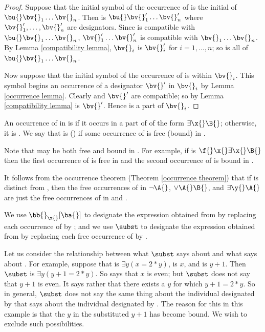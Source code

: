 \begin{proof}
    Suppose that the initial symbol of the occurrence of \bv{} is the initial \bu{} of $\bu{} \bv{}_1 \dots \bv{}_n$.
    Then \bv{} is $\bu{} \bv{}_1' \dots \bv{}_n'$ where $\bv{}_1', \dots, \bv{}_n'$ are designators.
    Since \bv{} is compatible with $\bu{} \bv{}_1 \dots \bv{}_n$, $\bv{}_1' \dots \bv{}_n'$ is compatible with $\bv{}_1 \dots \bv{}_n$.
    By Lemma \eqref{compatibility lemma}, $\bv{}_i$ is $\bv{}_i'$ for $i = 1, \dots, n$;
    so \bv{} is all of $\bu{} \bv{}_1 \dots \bv{}_n$.
    
    Now suppose that the initial symbol of the occurrence of \bv{} is within $\bv{}_i$.
    This symbol begins an occurrence of a designator $\bv{}'$ in $\bv{}_i$ by Lemma \eqref{occurrence lemma}.
    Clearly \bv{} and $\bv{}'$ are compatible;
    so by Lemma \eqref{compatibility lemma} \bv{} is $\bv{}'$.
    Hence \bv{} is a part of $\bv{}_i$.
\end{proof}

An occurrence of \x{} in \A{} is  \A{} if it occurs in a part of \A{} of the form $\exists \x{} \B{}$;
otherwise, it is  \A{}.
We say that \x{} is  ()  \A{} if some occurrence of \x{} is free (bound) in \A{}.

\begin{remark}
    Note that \x{} may be both free and bound in \A{}.
    For example, if \A{} is $\f{} \x{} \exists \x{} \B{}$ then the first occurrence of \x{} is free in \A{} and the second occurrence of \x{} is bound in \A{}.
\end{remark}

It follows from the occurrence theorem (Theorem \eqref{occurrence theorem}) that if \y{} is distinct from \x{}, then the free occurrences of \x{} in $\neg \A{}$, $\vee \A{} \B{}$, and $\exists \y{} \A{}$ are just the free occurrences of \x{} in \A{} and \B{}.

We use $\bb{}_\x{} [\ba{}]$ to designate the expression obtained from \bb{} by replacing each occurrence of \x{} by \ba{};
and we use $\subst$ to designate the expression obtained from \A{} by replacing each free occurrence of \x{} by \ba{}.


Let us consider the relationship between what $\subst$ says about \ba{} and what \A{} says about \x{}.
For example, suppose that \A{} is $\exists y (x = 2 * y)$, \x{} is $x$, and \ba{} is $y + 1$.
Then $\subst$ is $\exists y (y + 1 = 2 * y)$.
So \A{} says that $x$ is even;
but $\subst$ does not say that $y + 1$ is even.
It says rather that there exists a $y$ for which $y + 1 = 2 * y$.
So in general, $\subst$ does not say the same thing about the individual designated by \ba{} that \A{} says about the individual designated by \x{}.
The reason for this in this example is that the $y$ in the substituted $y + 1$ has become bound.
We wish to exclude such possibilities.

